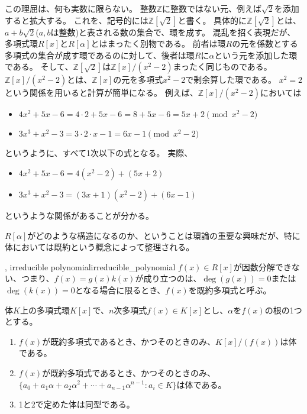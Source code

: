 この理屈は、何も実数に限らない。
整数$\mathbb{Z}$に整数ではない元、例えば$\sqrt{2}$を添加すると拡大する。
これを、記号的には$\mathbb{Z}[\sqrt{2}]$と書く。
具体的に$\mathbb{Z}[\sqrt{2}]$とは、$a+b\sqrt{2}$($a,b$は整数)と表される数の集合で、環を成す。
混乱を招く表現だが、多項式環$R[x]$と$R[\alpha]$とはまったく別物である。
前者は環$R$の元を係数とする多項式の集合が成す環であるのに対して、後者は環$R$に$\alpha$という元を添加した環である。
そして、$\mathbb{Z}[\sqrt{2}]$は$\mathbb{Z}[x]/(x^2-2)$まったく同じものである。
$\mathbb{Z}[x]/(x^2-2)$とは、$\mathbb{Z}[x]$の元を多項式$x^2-2$で剰余算した環である。
$x^2=2$という関係を用いると計算が簡単になる。
例えば、$\mathbb{Z}[x]/(x^2-2)$においては
\begin{itemize}
\item $4x^2+5x-6 = 4\cdot2 + 5x - 6 = 8 + 5x - 6 = 5x + 2 \pmod{x^2-2}$
\item $3x^3+x^2-3 = 3\cdot2\cdot x - 1 = 6x - 1 \pmod{x^2-2}$
\end{itemize}
というように、すべて1次以下の式となる。
実際、
\begin{itemize}
\item $4x^2 + 5x - 6 = 4(x^2 - 2) + (5x + 2)$
\item $3x^3+x^2-3 = (3x + 1)(x^2 - 2) + (6x - 1)$
\end{itemize}
というような関係があることが分かる。

$R[\alpha]$がどのような構造になるのか、ということは環論の重要な興味だが、特に体においては既約という概念によって整理される。

\begin{Defi}{, irreducible polynomial}{irreducible_polynomial}
$f(x)\in R[x]$が因数分解できない、つまり、$f(x)=g(x)k(x)$が成り立つのは、$\deg(g(x))=0$または$\deg(k(x))=0$となる場合に限るとき、$f(x)$を既約多項式と呼ぶ。
\end{Defi}

\begin{Theo}{}{}
体$K$上の多項式環$K[x]$で、$n$次多項式$f(x)\in K[x]$とし、$\alpha$を$f(x)$の根の1つとする。
\begin{enumerate}
 \item $f(x)$が既約多項式であるとき、かつそのときのみ、$K[x]/(f(x))$は体である。
 \item $f(x)$が既約多項式であるとき、かつそのときのみ、$\{a_0 + a_1\alpha + a_2\alpha^2 + \cdots + a_{n-1}\alpha^{n-1} : a_i \in K\}$は体である。
 \item 1と2で定めた体は同型である。
\end{enumerate}
\end{Theo}

